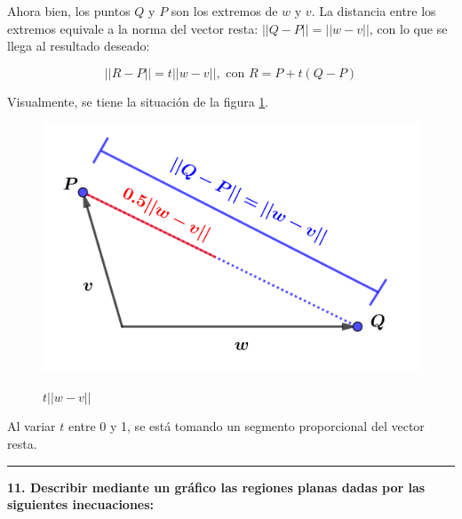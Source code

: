 \documentclass{article}
\begin{document}
\begin{enumerate}[(a)]
Ahora bien, los puntos $Q$ y $P$ son los extremos de $w$ y $v$. La distancia entre los extremos equivale a la norma del vector resta: $||Q-P|| = ||w-v||$, con lo que se llega al resultado deseado:

\begin{equation}
||R-P|| = t ||w-v||, \text{ con } R = P + t (Q-P)
\end{equation}

Visualmente, se tiene la situación de la figura \ref{fig:1-10-b}.  

\begin{figure}[ht]
\caption{$t ||w-v||$}
\includegraphics[scale=1]{img/ejercicios/1/10-b.png} 
\centering
\label{fig:1-10-b}
\end{figure}

Al variar $t$ entre 0 y 1, se está tomando un segmento proporcional del vector resta. 

\end{enumerate}

\hrule
\vspace{10 pt}
\textbf{11. Describir mediante un gráfico las regiones planas dadas por las siguientes inecuaciones:}
\end{document}
